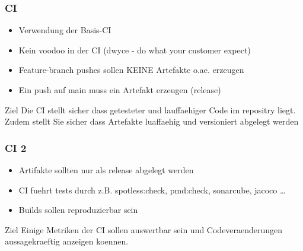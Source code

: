 \begin{frame}
    \frametitle{CI}
    \begin{itemize}
      \item Verwendung der Basis-CI
      \item Kein voodoo in der CI (dwyce - do what your customer expect)
      \item Feature-branch pushes sollen KEINE Artefakte o.ae. erzeugen
      \item Ein push auf main muss ein Artefakt erzeugen (release)
    \end{itemize}
    \begin{block}{Ziel}
        Die CI stellt sicher dass getesteter und lauffaehiger Code im repositry liegt. Zudem stellt Sie sicher dass Artefakte luaffaehig und versioniert abgelegt werden
    \end{block}
\end{frame}

\begin{frame}
    \frametitle{CI 2}
    \begin{itemize}
      \item Artifakte sollten nur als release abgelegt werden
      \item CI fuehrt tests durch z.B. spotless:check, pmd:check, sonarcube, jacoco \dots
      \item Builds sollen reproduzierbar sein
    \end{itemize}
    \begin{block}{Ziel}
        Einige Metriken der CI sollen auswertbar sein und Codeveraenderungen aussagekraeftig anzeigen koennen.
    \end{block}
\end{frame}

